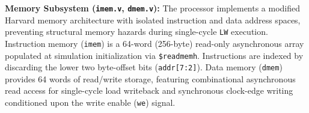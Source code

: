 
\noindent\textbf{Memory Subsystem (\texttt{imem.v}, \texttt{dmem.v}):} 
The processor implements a modified Harvard memory architecture with isolated instruction and data address spaces, preventing structural memory hazards during single-cycle \texttt{LW} execution. 
Instruction memory (\texttt{imem}) is a 64-word (256-byte) read-only asynchronous array populated at simulation initialization via \texttt{\$readmemh}. Instructions are indexed by discarding the lower two byte-offset bits (\texttt{addr[7:2]}). 
Data memory (\texttt{dmem}) provides 64 words of read/write storage, featuring combinational asynchronous read access for single-cycle load writeback and synchronous clock-edge writing conditioned upon the write enable (\texttt{we}) signal.

